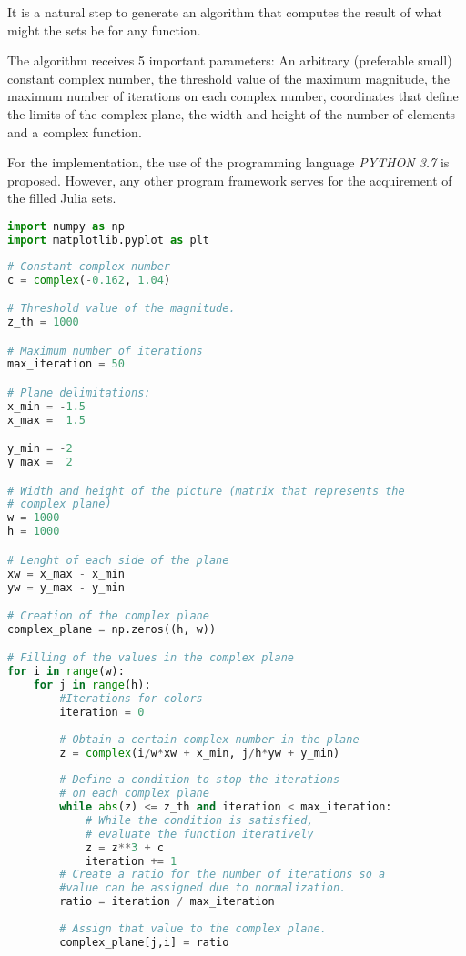 \documentclass{article}
\begin{document}
It is a natural step to generate an algorithm that computes the result of what might the sets be for any function.

The algorithm receives 5 important parameters:
An arbitrary (preferable small) constant complex number, the threshold value of the maximum magnitude, the maximum number of iterations on each complex number, coordinates that define the limits of the complex plane, the width and height of the number of elements and a complex function.

For the implementation, the use of the programming language \textit{PYTHON 3.7} is proposed. However, any other program framework serves for the acquirement of the filled Julia sets.


\begin{lstlisting}[language=Python, frame=single]
import numpy as np
import matplotlib.pyplot as plt
\end{lstlisting}

\begin{lstlisting}[language=Python, frame=single]
# Constant complex number
c = complex(-0.162, 1.04)

# Threshold value of the magnitude.
z_th = 1000

# Maximum number of iterations
max_iteration = 50

# Plane delimitations:
x_min = -1.5
x_max =  1.5

y_min = -2
y_max =  2

# Width and height of the picture (matrix that represents the
# complex plane) 
w = 1000
h = 1000

# Lenght of each side of the plane
xw = x_max - x_min
yw = y_max - y_min

# Creation of the complex plane
complex_plane = np.zeros((h, w))

# Filling of the values in the complex plane
for i in range(w):
    for j in range(h):
        #Iterations for colors
        iteration = 0
        
        # Obtain a certain complex number in the plane
        z = complex(i/w*xw + x_min, j/h*yw + y_min)
        
        # Define a condition to stop the iterations 
        # on each complex plane
        while abs(z) <= z_th and iteration < max_iteration:
            # While the condition is satisfied, 
            # evaluate the function iteratively
            z = z**3 + c
            iteration += 1
        # Create a ratio for the number of iterations so a
        #value can be assigned due to normalization.
        ratio = iteration / max_iteration
        
        # Assign that value to the complex plane. 
        complex_plane[j,i] = ratio


\end{lstlisting}
\end{document}
